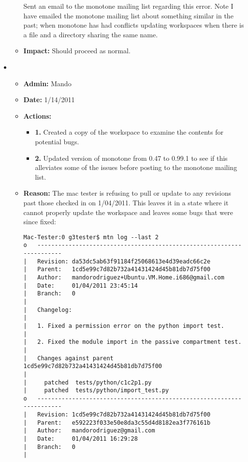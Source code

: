 \documentclass[12pt]{article}
\begin{document}
\begin{itemize}
\begin{itemize}
Sent an email to the monotone mailing list regarding this error. Note I have emailed the monotone mailing list about something similar in the past; when monotone has had conflicts updating workspaces when there is a file and a directory sharing the same name. 

\item[] {\bf Impact:}  Should proceed as normal.
\end{itemize}


\item 
\begin{itemize}
\item[] {\bf Admin:} Mando
\item[] {\bf Date:} 1/14/2011
\item[] {\bf Actions:} 

\begin{itemize}
\item[] {\bf 1.} Created a copy of the workspace to examine the contents for potential bugs. 
\item[] {\bf 2.} Updated version of monotone from 0.47 to 0.99.1 to see if this alleviates some of the issues before posting to the monotone mailing list.
\end{itemize}

\item[] {\bf Reason:}  The mac tester is refusing to pull or update to any revisions past those checked in on 1/04/2011. This leaves it in a state where it cannot properly update the workspace and leaves some bugs that were since fixed:

\begin{verbatim}
Mac-Tester:0 g3tester$ mtn log --last 2
o   ----------------------------------------------------------------------
|   Revision: da53dc5ab63f91184f25068613e4d39eadc66c2e
|   Parent:   1cd5e99c7d82b732a41431424d45b81db7d75f00
|   Author:   mandorodriguez+Ubuntu.VM.Home.i686@gmail.com
|   Date:     01/04/2011 23:45:14
|   Branch:   0
|   
|   Changelog: 
|   
|   1. Fixed a permission error on the python import test.
|   
|   2. Fixed the module import in the passive compartment test.
|   
|   Changes against parent 1cd5e99c7d82b732a41431424d45b81db7d75f00
|   
|     patched  tests/python/c1c2p1.py
|     patched  tests/python/import_test.py
o   ----------------------------------------------------------------------
|   Revision: 1cd5e99c7d82b732a41431424d45b81db7d75f00
|   Parent:   e592223f033e50e8da3c55d4d8182ea3f776161b
|   Author:   mandorodriguez@gmail.com
|   Date:     01/04/2011 16:29:28
|   Branch:   0
|   
\end{verbatim}


\end{itemize}
\end{itemize}
\end{document}
